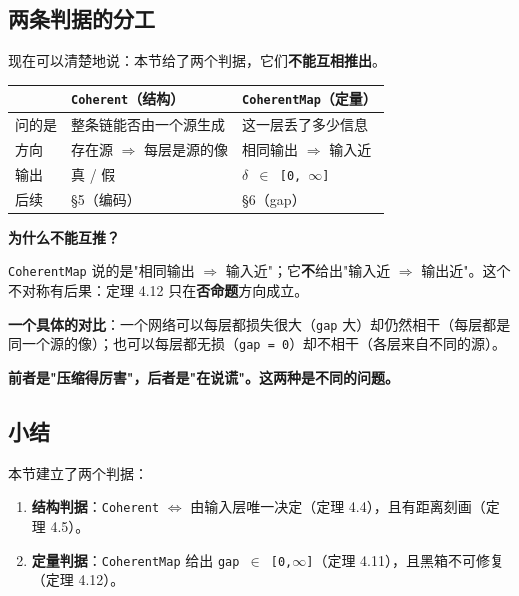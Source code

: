\documentclass[11pt,a4paper]{ctexart}
\begin{document}
\subsection{两条判据的分工}

现在可以清楚地说：本节给了两个判据，它们\textbf{不能互相推出}。

\begin{center}\small
\begin{tabular}{lll}
\toprule
 & \texttt{Coherent}（结构） & \texttt{CoherentMap}（定量） \\
\midrule
问的是 & 整条链能否由一个源生成 & 这一层丢了多少信息 \\
方向 & 存在源 \ensuremath{\Longrightarrow} 每层是源的像 & 相同输出 \ensuremath{\Longrightarrow} 输入近 \\
输出 & 真 / 假 & \texttt{\ensuremath{\delta} \ensuremath{\in} [0, \ensuremath{\infty}]} \\
后续 & §5（编码） & §6（gap） \\
\bottomrule
\end{tabular}
\end{center}

\textbf{为什么不能互推？}

\texttt{CoherentMap} 说的是"相同输出 \ensuremath{\Longrightarrow} 输入近"；它\textbf{不}给出"输入近 \ensuremath{\Longrightarrow} 输出近"。这个不对称有后果：定理 4.12 只在\textbf{否命题}方向成立。

\textbf{一个具体的对比}：一个网络可以每层都损失很大（\texttt{gap} 大）却仍然相干（每层都是同一个源的像）；也可以每层都无损（\texttt{gap = 0}）却不相干（各层来自不同的源）。

\textbf{前者是"压缩得厉害"，后者是"在说谎"。这两种是不同的问题。}

\subsection{小结}

本节建立了两个判据：

\begin{enumerate}
\item \textbf{结构判据}：\texttt{Coherent} \ensuremath{\Longleftrightarrow} 由输入层唯一决定（定理 4.4），且有距离刻画（定理 4.5）。
\item \textbf{定量判据}：\texttt{CoherentMap} 给出 \texttt{gap \ensuremath{\in} [0,\ensuremath{\infty}]}（定理 4.11），且黑箱不可修复（定理 4.12）。
\end{enumerate}
\end{document}
